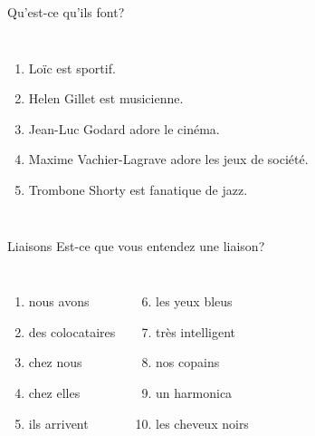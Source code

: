 \documentclass{beamer}
\begin{document}
  \begin{frame}{Qu'est-ce qu'ils font?}
    \begin{columns}
        \begin{enumerate}
          \item Loïc est sportif.
          \item<2-> Helen Gillet est musicienne.
          \item<3-> Jean-Luc Godard adore le cinéma.
          \item<4-> Maxime Vachier-Lagrave adore les jeux de société.
          \item<5-> Trombone Shorty est fanatique de jazz.
        \end{enumerate}
        \begin{minipage}[c][0.6\textheight]{\linewidth}
          \begin{center}
          \end{center}
        \end{minipage}
    \end{columns}
  \end{frame}

  \begin{frame}{Liaisons}
    Est-ce que vous entendez une liaison?
    \begin{columns}
        \begin{enumerate}
          \item nous avons \underline{}
          \item des colocataires \underline{\uncover<3->{non}}
          \item chez nous \underline{}
          \item chez elles \underline{\uncover<5->{oui}}
          \item ils arrivent \underline{}
        \end{enumerate}
        \begin{enumerate}
          \setcounter{enumi}{5}
          \item les yeux bleus \underline{\uncover<7->{oui}}
          \item très intelligent \underline{}
          \item nos copains \underline{}
          \item un harmonica \underline{}
          \item les cheveux noirs \underline{}
        \end{enumerate}
    \end{columns}
  \end{frame}
\end{document}

